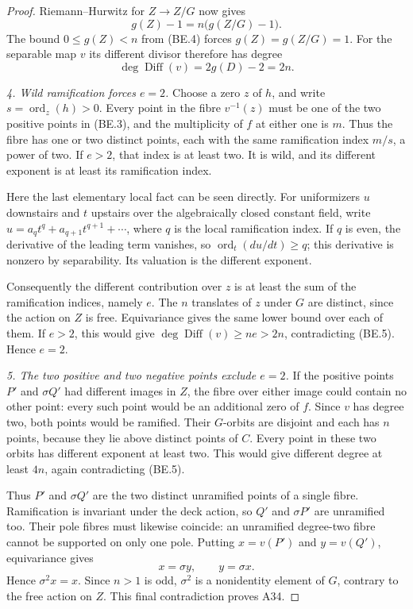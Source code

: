 \begin{proof}
Riemann--Hurwitz for $Z\to Z/G$ now gives
\[
                       g(Z)-1=n\bigl(g(Z/G)-1\bigr).
\]
The bound $0\le g(Z)<n$ from (BE.4) forces
$g(Z)=g(Z/G)=1$.
For the separable map $v$ its different divisor therefore has
degree
\[
                    \deg\operatorname{Diff}(v)=2g(D)-2=2n.
 \tag{BE.5}
\]

\emph{4. Wild ramification forces $e=2$.}
Choose a zero $z$ of $h$, and write $s=\operatorname{ord}_z(h)>0$.
Every point in the fibre $v^{-1}(z)$ must be one of the two
positive points in (BE.3), and the multiplicity of $f$ at either
one is $m$. Thus the fibre has one or two distinct points,
each with the same ramification index $m/s$, a power of two.
If $e>2$, that index is at least two. It is wild, and its
different exponent is at least its ramification index.

Here the last elementary local fact can be seen directly.
For uniformizers $u$ downstairs and $t$ upstairs over the
algebraically closed constant field, write
$u=a_qt^q+a_{q+1}t^{q+1}+\cdots$, where $q$ is the local
ramification index. If $q$ is even, the derivative of the
leading term vanishes, so
$\operatorname{ord}_t(du/dt)\ge q$; this derivative is nonzero
by separability. Its valuation is the different exponent.

Consequently the different contribution over $z$ is at least
the sum of the ramification indices, namely $e$.
The $n$ translates of $z$ under $G$ are distinct, since the
action on $Z$ is free. Equivariance gives the same lower bound
over each of them. If $e>2$, this would give
$\deg\operatorname{Diff}(v)\ge ne>2n$, contradicting (BE.5).
Hence $e=2$.

\emph{5. The two positive and two negative points exclude $e=2$.}
If the positive points $P'$ and $\sigma Q'$ had different
images in $Z$, the fibre over either image could contain
no other point: every such point would be an additional
zero of $f$. Since $v$ has degree two, both points would
be ramified. Their $G$-orbits are disjoint and each has $n$
points, because they lie above distinct points of $C$.
Every point in these two orbits has different exponent at
least two. This would give different degree at least $4n$,
again contradicting (BE.5).

Thus $P'$ and $\sigma Q'$ are the two distinct unramified
points of a single fibre. Ramification is invariant under
the deck action, so $Q'$ and $\sigma P'$ are unramified too.
Their pole fibres must likewise coincide: an unramified
degree-two fibre cannot be supported on only one pole.
Putting $x=v(P')$ and $y=v(Q')$, equivariance gives
\[
                         x=\sigma y,\qquad y=\sigma x.
 \tag{BE.6}
\]
Hence $\sigma^2x=x$. Since $n>1$ is odd, $\sigma^2$ is a
nonidentity element of $G$, contrary to the free action on
$Z$. This final contradiction proves A34.
\end{proof}

